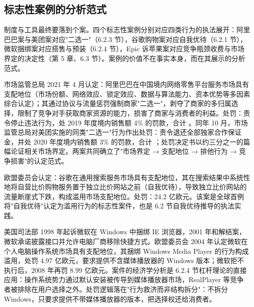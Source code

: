 \subsection{标志性案例的分析范式}

制度与工具最终要落到个案。四个标志性案例分别对应四类行为的执法展开：阿里巴巴案与美团案对应"二选一"（6.2.3 节），谷歌购物案对应自我优待（6.2.1 节），微软捆绑案对应搭售与预装（6.2.4 节），Epic 诉苹果案对应竞争瓶颈收费与市场界定的决定性（第 5 章、6.3 节）。案例的价值不在事实本身，而在其展示的分析范式。

\begin{case}
市场监管总局 2021 年 4 月认定：阿里巴巴在中国境内网络零售平台服务市场具有支配地位（市场份额、网络效应、锁定效应、数据与算法能力、资本优势等多因素综合认定）；其通过协议与流量惩罚强制商家"二选一"，剥夺了商家的多归属选择，限制了竞争对手获取商家资源的能力，损害了商家与消费者的利益。处罚：责令停止违法行为，处 2019 年度境内销售额 4\% 的罚款，合计 。同年 10 月，市场监管总局对美团实施的同类"二选一"行为作出处罚：责令退还全部独家合作保证金，并处 2020 年度境内销售额 3\% 的罚款，合计 ；处罚决定书以约三分之一的篇幅论证相关市场界定。两案共同确立了"市场界定 → 支配地位 → 排他行为 → 竞争损害"的认定范式。
\end{case}

\begin{case}[谷歌购物案（欧盟，2017）]
欧盟委员会认定：谷歌在通用搜索服务市场具有支配地位，其在搜索结果中系统性地将自营比价购物服务置于独立比价网站之前（自我优待），导致独立比价网站的流量断崖式下跌，构成滥用市场支配地位。处罚：24.2 亿欧元。该案是全球首例将"自我优待"认定为滥用行为的标志性案件，也是 6.2 节自我优待推导的执法实践。
\end{case}

\begin{case}
美国司法部 1998 年起诉微软在 Windows 中捆绑 IE 浏览器，2001 年和解结案，微软承诺披露接口并允许电脑厂商移除快捷方式。欧盟委员会 2004 年认定微软在个人电脑操作系统市场具有支配地位，其捆绑 Windows Media Player 的行为构成滥用，处罚 4.97 亿欧元，要求提供不含媒体播放器的 Windows 版本；微软拒不执行后，2008 年再罚 8.99 亿欧元。案件的经济学分析是 6.2.4 节杠杆理论的直接应用：操作系统势力通过默认安装被传导到媒体播放器市场，RealPlayer 等竞争者被排除在用户选择之外。处罚逻辑落在"行为救济而非结构拆分"：不拆分 Windows，只要求提供不带媒体播放器的版本，把选择权还给消费者。
\end{case}

